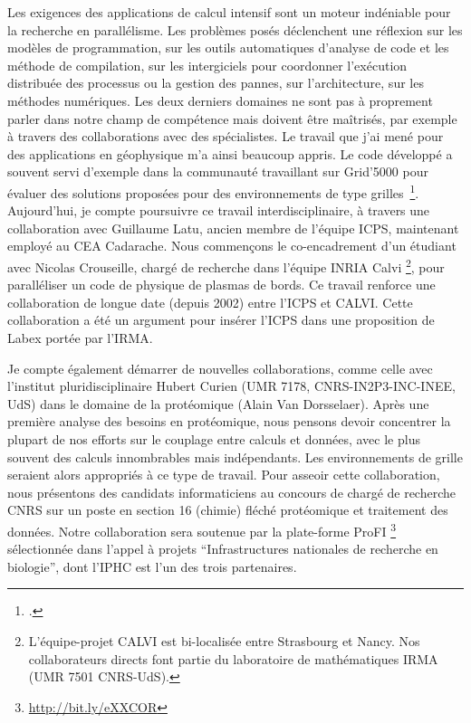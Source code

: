 \documentclass[11pt]{article}
\begin{document}
Les exigences des applications de calcul intensif sont un moteur indéniable
pour la recherche en parallélisme. Les problèmes posés déclenchent une 
réflexion sur les modèles de programmation, sur les outils automatiques
d'analyse de code et les méthode de compilation, sur les intergiciels 
pour coordonner l'exécution distribuée des processus ou la gestion des pannes, 
sur l'architecture, sur les méthodes numériques. Les deux derniers domaines ne
 sont pas à proprement parler dans notre champ de compétence mais doivent
être maîtrisés, par exemple à travers des collaborations avec des 
spécialistes. Le travail que j'ai mené pour des applications en géophysique 
m'a ainsi beaucoup appris. Le code développé a souvent servi d'exemple dans
la communauté travaillant sur Grid'5000 pour évaluer des solutions proposées
pour des environnements de type grilles~\footcite{Cappello07}. \\

Aujourd'hui, je compte poursuivre ce travail interdisciplinaire, à travers une 
collaboration avec Guillaume Latu, ancien membre de l'équipe ICPS, maintenant 
employé au CEA Cadarache. Nous commençons le co-encadrement d'un étudiant 
avec Nicolas Crouseille, chargé de recherche dans l'équipe INRIA Calvi%
\footnote{L'équipe-projet CALVI est bi-localisée entre Strasbourg et Nancy.
Nos collaborateurs directs font partie du laboratoire de mathématiques IRMA 
(UMR 7501 CNRS-UdS).}, pour paralléliser un 
code de physique de plasmas de bords. Ce travail renforce une collaboration 
de longue date (depuis 2002) entre l'ICPS et CALVI. Cette collaboration a été
un argument pour insérer l'ICPS dans une proposition de Labex portée par l'IRMA.

Je compte également démarrer de nouvelles collaborations, comme celle
avec l'institut pluridisciplinaire Hubert Curien (UMR 7178, CNRS-IN2P3-INC-INEE, UdS) 
dans le domaine de la protéomique (Alain Van Dorsselaer). Après une première 
analyse des besoins en protéomique, nous pensons devoir concentrer la plupart de
nos efforts sur le couplage entre calculs et données, avec le plus souvent des
calculs innombrables mais indépendants. Les environnements de grille seraient 
alors appropriés à ce type de travail. Pour asseoir cette collaboration, nous 
présentons des candidats informaticiens au concours de chargé de recherche CNRS 
sur un poste en section 16 (chimie) fléché protéomique et traitement des données.
Notre collaboration sera soutenue par la plate-forme ProFI%
\footnote{\url{http://bit.ly/eXXCOR}}
sélectionnée dans l'appel à projets ``Infrastructures nationales de recherche 
en  biologie'', dont l'IPHC est l'un des trois partenaires.
\end{document}
